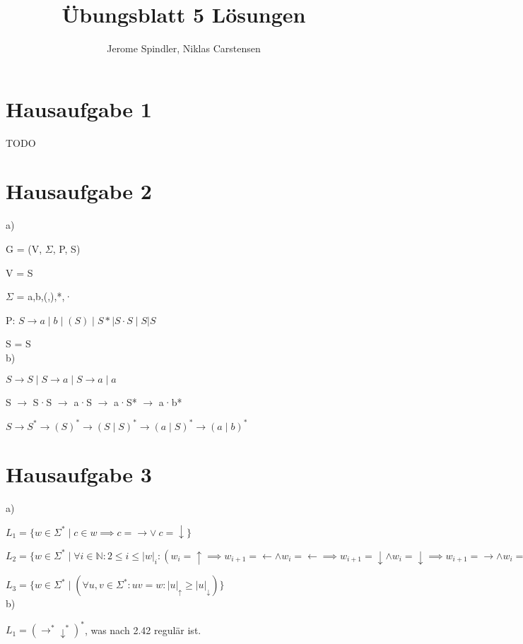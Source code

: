 \documentclass{article}
\title{Übungsblatt 5 Lösungen}
\author{Jerome Spindler, Niklas Carstensen}
\begin{document}
\maketitle

\section{Hausaufgabe 1}

TODO

\section{Hausaufgabe 2}

a)
 
G = (V, $\Sigma$, P, S) 

V = {S} 

$\Sigma$ = {a,b,(,),*,·} 

P: $S \rightarrow a \mid b \mid (S) \mid S* \mid S·S \mid S|S$

S = S 
\\ 
b)

$S \rightarrow S \mid S \rightarrow a \mid S \rightarrow a \mid a$

S $\rightarrow$ S·S $\rightarrow$ a·S $\rightarrow$ a·S* 
$\rightarrow$ a·b*

$S \rightarrow S^* \rightarrow (S)^* \rightarrow (S \mid S)^* 
\rightarrow (a \mid S)^* \rightarrow (a \mid b)^*$

\section{Hausaufgabe 3}

a)

$L_{1} = \{w \in \Sigma^* \mid c \in w \implies 
c = \rightarrow \lor \: c = \downarrow \}$

$L_{2} = \{w \in \Sigma^* \mid \forall i \in 
\mathbb{N} : 2 \leq i \leq \left| w \right|_i : 
(w_i = \uparrow \implies w_{i+1} = \leftarrow \land
w_i = \leftarrow \implies w_{i+1} = \downarrow \land
w_i = \downarrow \implies w_{i+1} = \rightarrow \land
w_i = \rightarrow \implies w_{i+1} = \uparrow \land )\}$

$L_{3} = \{w \in \Sigma^* \mid (\forall u,v \in \Sigma^* :
uv = w : \left| u \right|_\uparrow \geq \left| u \right|_\downarrow) \}$
\\
b)

$L_{1} = (\rightarrow^* \downarrow^*)^* $, was nach 2.42 regulär ist.
\end{document}
